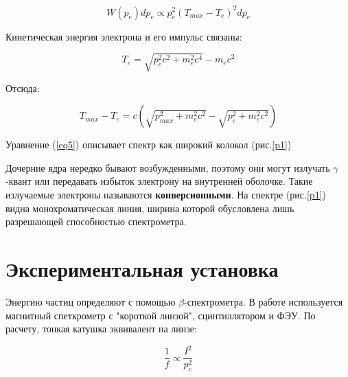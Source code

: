 \documentclass[a4paper]{article}
\begin{document}
\begin{equation}
    W(p_e)dp_e \propto p_e^2 (T_{max} - T_e)^2 dp_e
    \label{eq3}
\end{equation}

Кинетическая энергия электрона и его импульс связаны:

\begin{equation}
    T_e = \sqrt{p_e^2 c^2 + m_e^2 c^4} - m_e c^2
    \label{eq4}
\end{equation}

Отсюда:

\begin{equation}
    T_{max} - T_e = c (\sqrt{p_{max}^2 + m_e^2 c^2} - \sqrt{p_e^2 + m_e^2 c^2})
    \label{eq5}
\end{equation}

Уравнение (\ref{eq5}) описывает спектр как широкий колокол (рис.\ref{p1}) 

Дочерние ядра нередко бывают возбужденными, поэтому они могут излучать $\gamma$-квант или 
передавать избыток электрону на внутренней оболочке. Такие излучаемые электроны называются 
\textbf{конверсионными}. На спектре  (рис.\ref{p1}) видна монохроматическая линия, ширина
которой обусловлена лишь разрешающей способностью спектрометра.

\section{Экспериментальная установка}

Энергию частиц определяют с помощью $\beta$-спектрометра. В работе используется 
магнитный спеткрометр с "короткой линзой", сцинтиллятором и ФЭУ. По расчету, 
тонкая катушка эквивалент на линзе:

\begin{equation}
    \frac{1}{f} \varpropto \frac{I^2}{p_e^2}
    \label{eq6}
\end{equation}
\end{document}
